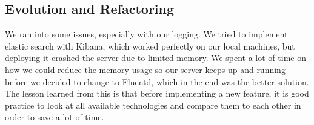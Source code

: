 \subsection{Evolution and Refactoring}

We ran into some issues, especially with our logging.
We tried to implement elastic search with Kibana, which worked perfectly on our local machines, but deploying it crashed the server due to limited memory.
We spent a lot of time on how we could reduce the memory usage so our server keeps up and running before we decided to change to Fluentd, which in the end was the better solution.
The lesson learned from this is that before implementing a new feature, it is good practice to look at all available technologies and compare them to each other in order to save a lot of time.
